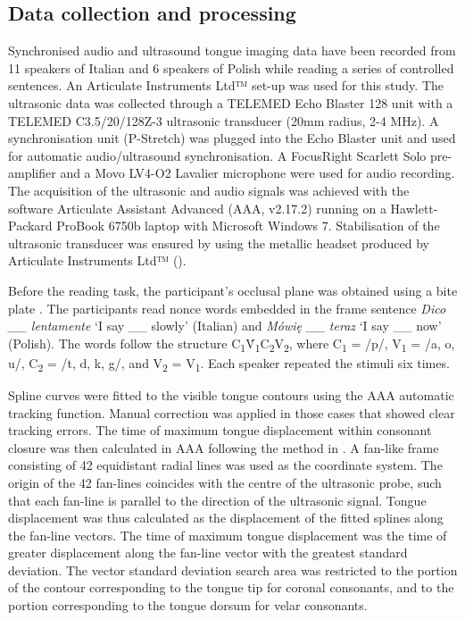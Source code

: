 \documentclass[11pt,]{article}
\begin{document}
\hypertarget{data-collection-and-processing}{%
\subsection{Data collection and
processing}\label{data-collection-and-processing}}

\label{s:data}

Synchronised audio and ultrasound tongue imaging data have been recorded
from 11 speakers of Italian and 6 speakers of Polish while reading a
series of controlled sentences. An Articulate Instruments Ltd™ set-up
was used for this study. The ultrasonic data was collected through a
TELEMED Echo Blaster 128 unit with a TELEMED C3.5/20/128Z-3 ultrasonic
transducer (20mm radius, 2-4 MHz). A synchronisation unit (P-Stretch)
was plugged into the Echo Blaster unit and used for automatic
audio/ultrasound synchronisation. A FocusRight Scarlett Solo
pre-amplifier and a Movo LV4-O2 Lavalier microphone were used for audio
recording. The acquisition of the ultrasonic and audio signals was
achieved with the software Articulate Assistant Advanced (AAA, v2.17.2)
running on a Hawlett-Packard ProBook 6750b laptop with Microsoft Windows
7. Stabilisation of the ultrasonic transducer was ensured by using the
metallic headset produced by Articulate Instruments Ltd™
(\citeyear{articulate2008}).

Before the reading task, the participant's occlusal plane was obtained
using a bite plate \citep{scobbie2011}. The participants read nonce
words embedded in the frame sentence \emph{Dico \_\_ lentamente} `I say
\_\_ slowly' (Italian) and \emph{Mówię \_\_ teraz} `I say \_\_ now'
(Polish). The words follow the structure
C\textsubscript{1}V́\textsubscript{1}C\textsubscript{2}V\textsubscript{2},
where C\textsubscript{1} = /p/, V\textsubscript{1} = /a, o, u/,
C\textsubscript{2} = /t, d, k, g/, and V\textsubscript{2} =
V\textsubscript{1}. Each speaker repeated the stimuli six times.

Spline curves were fitted to the visible tongue contours using the AAA
automatic tracking function. Manual correction was applied in those
cases that showed clear tracking errors. The time of maximum tongue
displacement within consonant closure was then calculated in AAA
following the method in \citet{strycharczuk2015}. A fan-like frame
consisting of 42 equidistant radial lines was used as the coordinate
system. The origin of the 42 fan-lines coincides with the centre of the
ultrasonic probe, such that each fan-line is parallel to the direction
of the ultrasonic signal. Tongue displacement was thus calculated as the
displacement of the fitted splines along the fan-line vectors. The time
of maximum tongue displacement was the time of greater displacement
along the fan-line vector with the greatest standard deviation. The
vector standard deviation search area was restricted to the portion of
the contour corresponding to the tongue tip for coronal consonants, and
to the portion corresponding to the tongue dorsum for velar consonants.
\end{document}
